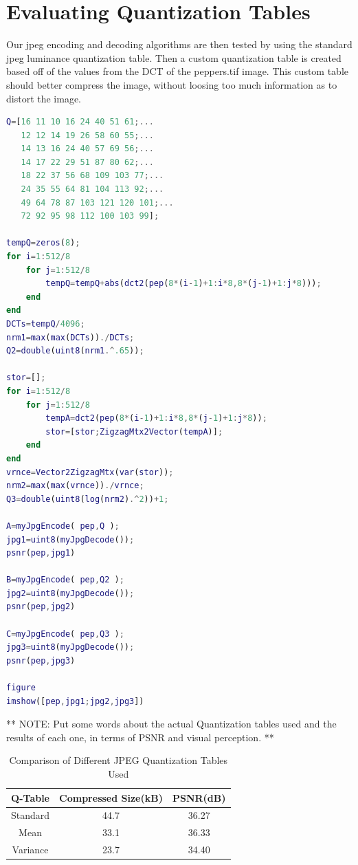 \documentclass{article}
\begin{document}
\newpage
\section{Evaluating Quantization Tables}
\qquad Our jpeg encoding and decoding algorithms are then tested by using
the standard jpeg luminance quantization table. Then a custom quantization
table is created based off of the values from the DCT of the peppers.tif
image. This custom table should better compress the image, without loosing
too much information as to distort the image.  

\begin{lstlisting}[language=Matlab]
Q=[16 11 10 16 24 40 51 61;...
   12 12 14 19 26 58 60 55;...
   14 13 16 24 40 57 69 56;...
   14 17 22 29 51 87 80 62;...
   18 22 37 56 68 109 103 77;...
   24 35 55 64 81 104 113 92;...
   49 64 78 87 103 121 120 101;...
   72 92 95 98 112 100 103 99];

tempQ=zeros(8);
for i=1:512/8
    for j=1:512/8
        tempQ=tempQ+abs(dct2(pep(8*(i-1)+1:i*8,8*(j-1)+1:j*8)));
    end
end
DCTs=tempQ/4096;
nrm1=max(max(DCTs))./DCTs;
Q2=double(uint8(nrm1.^.65));

stor=[];
for i=1:512/8
    for j=1:512/8
        tempA=dct2(pep(8*(i-1)+1:i*8,8*(j-1)+1:j*8));
        stor=[stor;ZigzagMtx2Vector(tempA)];
    end
end
vrnce=Vector2ZigzagMtx(var(stor));
nrm2=max(max(vrnce))./vrnce;
Q3=double(uint8(log(nrm2).^2))+1;

A=myJpgEncode( pep,Q );
jpg1=uint8(myJpgDecode());
psnr(pep,jpg1)

B=myJpgEncode( pep,Q2 );
jpg2=uint8(myJpgDecode());
psnr(pep,jpg2)

C=myJpgEncode( pep,Q3 );
jpg3=uint8(myJpgDecode());
psnr(pep,jpg3)

figure
imshow([pep,jpg1;jpg2,jpg3])
\end{lstlisting}

** NOTE: Put some words about the actual Quantization tables used and the
results of each one, in terms of PSNR and visual perception. **


\begin{table}[H]
\centering
\begin{tabular}{ |c|c|c| } 
 \hline
 Q-Table & Compressed Size(kB) & PSNR(dB) \\ 
 \hline
 Standard 	& 44.7 & 36.27 \\ 
 Mean 		& 33.1 & 36.33 \\ 
 Variance 	& 23.7 & 34.40 \\ 
 \hline
\end{tabular}
\caption{Comparison of Different JPEG Quantization Tables Used}
\label{snrTab}
\end{table}
   
\end{document}
